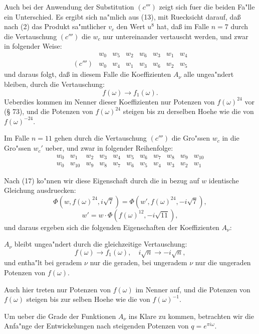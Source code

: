 \documentclass[12pt,a4paper]{article}
\theoremstyle{plain}
\theoremstyle{definition}
\theoremstyle{remark}
\begin{document}
Auch bei der Anwendung der Substitution $(c''')$ zeigt sich fuer die beiden Fa"lle ein Unterschied. Es ergibt sich na"mlich aus (13), mit Ruecksicht darauf, da\ss{} nach (2) das Produkt sa"mtlicher $v_c$ den Wert $u^8$ hat, da\ss{} im Falle $n = 7$ durch die Vertauschung $(c''')$ die $w_c$ nur untereinander vertauscht werden, und zwar in folgender Weise:
\[
\begin{array}{c|ccccccc}
 & w_0 & w_5 & w_2 & w_6 & w_3 & w_1 & w_4 \\ \hline
(c''') & w_0 & w_4 & w_1 & w_3 & w_6 & w_2 & w_5
\end{array}
\]
und daraus folgt, da\ss{} in diesem Falle die Koeffizienten $A_\nu$ alle ungea"ndert bleiben, durch die Vertauschung:
\[
f(\omega) \to f_1(\omega).
\]
Ueberdies kommen im Nenner dieser Koeffizienten nur Potenzen von $f(\omega)^{24}$ vor (\S{} 73), und die Potenzen von $f(\omega)^{24}$ steigen bis zu derselben Hoehe wie die von $f(\omega)^{-24}$.

Im Falle $n = 11$ gehen durch die Vertauschung $(c''')$ die Gro"ssen $w_c$ in die Gro"ssen $w_c'$ ueber, und zwar in folgender Reihenfolge:
\[
\begin{array}{ccccccccccc}
w_0 & w_1 & w_2 & w_3 & w_4 & w_5 & w_6 & w_7 & w_8 & w_9 & w_{10} \\
w_0 & w_{10} & w_9 & w_8 & w_7 & w_6 & w_5 & w_4 & w_3 & w_2 & w_1
\end{array}
\]

Nach (17) ko"nnen wir diese Eigenschaft durch die in bezug auf $w$ identische Gleichung ausdruecken:
\[
\Phi(w, f(\omega)^{24}, i\sqrt{7}) = \Phi(w', f(\omega)^{24}, -i\sqrt{7}),
\]
\[
w' = w \cdot \Phi(f(\omega)^{12}, -i\sqrt{11}),
\]
und daraus ergeben sich die folgenden Eigenschaften der Koeffizienten $A_\nu$:

$A_\nu$ bleibt ungea"ndert durch die gleichzeitige Vertauschung:
\begin{equation}\label{eq:133_18}
f(\omega) \to f_1(\omega), \quad i\sqrt{n} \to -i\sqrt{n},
\end{equation}
und entha"lt bei geradem $\nu$ nur die geraden, bei ungeradem $\nu$ nur die ungeraden Potenzen von $f(\omega)$.

Auch hier treten nur Potenzen von $f(\omega)$ im Nenner auf, und die Potenzen von $f(\omega)$ steigen bis zur selben Hoehe wie die von $f(\omega)^{-1}$.

Um ueber die Grade der Funktionen $A_\nu$ ins Klare zu kommen, betrachten wir die Anfa"nge der Entwickelungen nach steigenden Potenzen von $q = e^{\pi i \omega}$.
\end{document}
